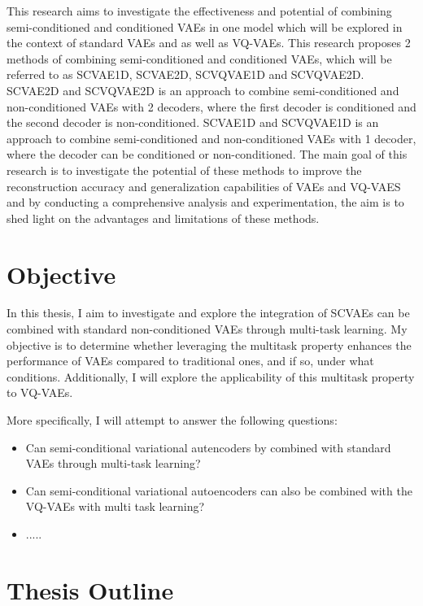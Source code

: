 This research aims to investigate the effectiveness and potential of combining semi-conditioned and conditioned VAEs in one model which will be explored in the context of standard VAEs and as well as VQ-VAEs. This research proposes 2 methods of combining semi-conditioned and conditioned VAEs, which will be referred to as SCVAE1D, SCVAE2D, SCVQVAE1D and SCVQVAE2D. SCVAE2D and SCVQVAE2D is an approach to combine semi-conditioned and non-conditioned VAEs with 2 decoders, where the first decoder is conditioned and the second decoder is non-conditioned. SCVAE1D and SCVQVAE1D is an approach to combine semi-conditioned and non-conditioned VAEs with 1 decoder, where the decoder can be conditioned or non-conditioned. The main goal of this research is to investigate the potential of these methods to improve the reconstruction accuracy and generalization capabilities of VAEs and VQ-VAES and by conducting a comprehensive analysis and experimentation, the aim is to shed light on the advantages and limitations of these methods.

\section{Objective}

In this thesis, I aim to investigate and explore the integration of SCVAEs can be combined with standard non-conditioned VAEs through multi-task learning. My objective is to determine whether leveraging the multitask property enhances the performance of VAEs compared to traditional ones, and if so, under what conditions. Additionally, I will explore the applicability of this multitask property to VQ-VAEs.

More specifically, I will attempt to answer the following questions:

\begin{itemize}
    \item Can semi-conditional variational autencoders by combined with standard VAEs through multi-task learning?
    \item Can semi-conditional variational autoencoders can also be combined with the VQ-VAEs with multi task learning?
    \item .....
\end{itemize}



\section{Thesis Outline}



